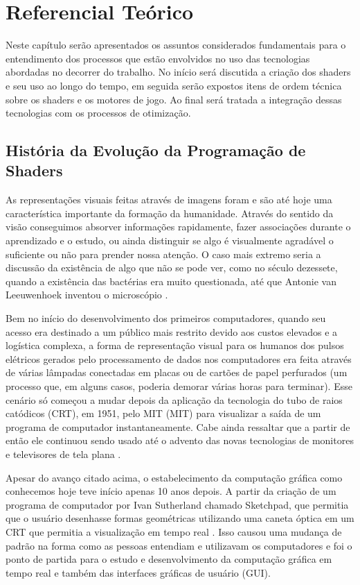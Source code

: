 \chapter{Referencial Teórico}
\label{cap:referencial-teorico}

Neste capítulo serão apresentados os assuntos considerados fundamentais para o entendimento dos processos que estão envolvidos no uso das tecnologias abordadas no decorrer do trabalho. No início será discutida a criação dos shaders e seu uso ao longo do tempo, em seguida serão expostos itens de ordem técnica sobre os shaders e os motores de jogo. Ao final será tratada a integração dessas tecnologias com os processos de otimização.

\section{História da Evolução da Programação de Shaders}
\label{sec:historia-evolucao-programacao-shaders}

As representações visuais feitas através de imagens foram e são até hoje uma característica importante da formação da humanidade. Através do sentido da visão conseguimos absorver informações rapidamente, fazer associações durante o aprendizado e o estudo, ou ainda distinguir se algo é visualmente agradável o suficiente ou não para prender nossa atenção. O caso mais extremo seria a discussão da existência de algo que não se pode ver, como no século dezessete, quando a existência das bactérias era muito questionada, até que Antonie van Leeuwenhoek inventou o microscópio \cite{openGLBook}.

Bem no início do desenvolvimento dos primeiros computadores, quando seu acesso era destinado a um público mais restrito devido aos custos elevados e a logística complexa, a forma de representação visual para os humanos dos pulsos elétricos gerados pelo processamento de dados nos computadores era feita através de várias lâmpadas conectadas em placas ou de cartões de papel perfurados (um processo que, em alguns casos, poderia demorar várias horas para terminar). Esse cenário só começou a mudar depois da aplicação da tecnologia do tubo de raios catódicos (\acrshort{CRT}), em 1951, pelo MIT (\acrlong{MIT}) para visualizar a saída de um programa de computador instantaneamente. Cabe ainda ressaltar que a partir de então ele continuou sendo usado até o advento das novas tecnologias de monitores e televisores de tela plana \cite{openGLBook}.

Apesar do avanço citado acima, o estabelecimento da computação gráfica como conhecemos hoje teve início apenas 10 anos depois. A partir da criação de um programa de computador por Ivan Sutherland chamado Sketchpad, que permitia que o usuário desenhasse formas geométricas utilizando uma caneta óptica em um \acrshort{CRT} que permitia a visualização em tempo real \cite{openGLBook}. Isso causou uma mudança de padrão na forma como as pessoas entendiam e utilizavam os computadores e foi o ponto de partida para o estudo e desenvolvimento da computação gráfica em tempo real e também das interfaces gráficas de usuário (\acrshort{GUI}).

